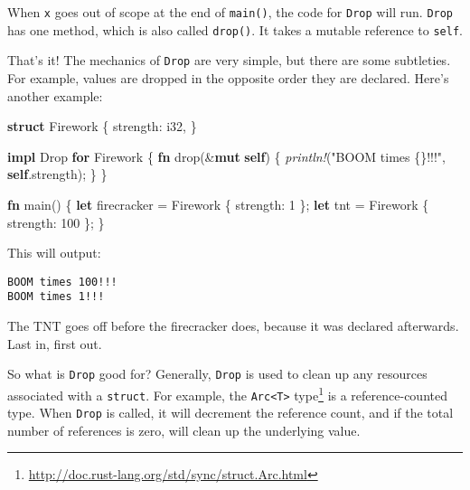 \documentclass[a4paper,]{book}
\newenvironment{Shaded}{\begin{snugshade}}{\end{snugshade}}
\newcommand{\KeywordTok}[1]{\textcolor[rgb]{0.13,0.29,0.53}{\textbf{{#1}}}}
\newcommand{\DataTypeTok}[1]{\textcolor[rgb]{0.13,0.29,0.53}{{#1}}}
\newcommand{\DecValTok}[1]{\textcolor[rgb]{0.00,0.00,0.81}{{#1}}}
\newcommand{\StringTok}[1]{\textcolor[rgb]{0.31,0.60,0.02}{{#1}}}
\newcommand{\BuiltInTok}[1]{{#1}}
\newcommand{\PreprocessorTok}[1]{\textcolor[rgb]{0.56,0.35,0.01}{\textit{{#1}}}}
\newcommand{\NormalTok}[1]{{#1}}
\renewcommand{\href}[2]{#2\footnote{\url{#1}}}
\begin{document}
When \texttt{x} goes out of scope at the end of \texttt{main()}, the
code for \texttt{Drop} will run. \texttt{Drop} has one method, which is
also called \texttt{drop()}. It takes a mutable reference to
\texttt{self}.

That's it! The mechanics of \texttt{Drop} are very simple, but there are
some subtleties. For example, values are dropped in the opposite order
they are declared. Here's another example:

\begin{Shaded}
\begin{Highlighting}[]
\KeywordTok{struct} \NormalTok{Firework \{}
    \NormalTok{strength: }\DataTypeTok{i32}\NormalTok{,}
\NormalTok{\}}

\KeywordTok{impl} \BuiltInTok{Drop} \KeywordTok{for} \NormalTok{Firework \{}
    \KeywordTok{fn} \NormalTok{drop(&}\KeywordTok{mut} \KeywordTok{self}\NormalTok{) \{}
        \PreprocessorTok{println!}\NormalTok{(}\StringTok{"BOOM times \{\}!!!"}\NormalTok{, }\KeywordTok{self}\NormalTok{.strength);}
    \NormalTok{\}}
\NormalTok{\}}

\KeywordTok{fn} \NormalTok{main() \{}
    \KeywordTok{let} \NormalTok{firecracker = Firework \{ strength: }\DecValTok{1} \NormalTok{\};}
    \KeywordTok{let} \NormalTok{tnt = Firework \{ strength: }\DecValTok{100} \NormalTok{\};}
\NormalTok{\}}
\end{Highlighting}
\end{Shaded}

This will output:

\begin{verbatim}
BOOM times 100!!!
BOOM times 1!!!
\end{verbatim}

The TNT goes off before the firecracker does, because it was declared
afterwards. Last in, first out.

So what is \texttt{Drop} good for? Generally, \texttt{Drop} is used to
clean up any resources associated with a \texttt{struct}. For example,
the
\href{http://doc.rust-lang.org/std/sync/struct.Arc.html}{\texttt{Arc\textless{}T\textgreater{}}
type} is a reference-counted type. When \texttt{Drop} is called, it will
decrement the reference count, and if the total number of references is
zero, will clean up the underlying value.

\end{document}
